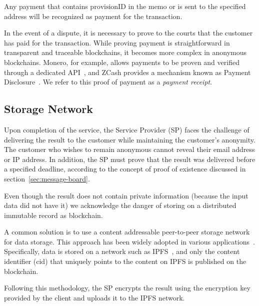 \documentclass[pdftex,twocolumn,epjc3]{svjour3}
\begin{document}
Any payment that contains $\textrm{provisionID}$ in the memo or is sent to the specified address will be recognized as payment for the transaction. 


\begin{sloppypar}
In the event of a dispute, it is necessary to prove to the courts that the customer has paid for the transaction. While proving payment is straightforward in transparent and traceable blockchains, it becomes more complex in anonymous blockchains. Monero, for example, allows payments to be proven and verified through a dedicated API~\cite{moneroHowProvePayment}, and ZCash provides a mechanism known as Payment Disclosure~\cite{daviesIntroductionPaymentDisclosure2017}. We refer to this proof of payment as a \textit{payment receipt}.
\end{sloppypar}

\subsection{Storage Network}\label{storage-network}

Upon completion of the service, the Service Provider (SP) faces the challenge of delivering the result to the customer while maintaining the customer's anonymity. The customer who wishes to remain anonymous cannot reveal their email address or IP address. In addition, the SP must prove that the result was delivered before a specified deadline, according to the concept of proof of existence discussed in section~\ref{sec:message-board}.

Even though the result does not contain private information (because the input data did not have it) we acknowledge the danger of storing on a distributed immutable record as blockchain.

\begin{sloppypar}
A common solution is to use a content addressable peer-to-peer storage network for data storage. This approach has been widely adopted in various applications~\cite{shahidBlockchainBasedAgriFoodSupply2020, wangAuditableProtocolsFair2019, chenImprovedP2PFile2017}. Specifically, data is stored on a network such as IPFS~\cite{benetIPFSContentAddressed2014}, and only the content identifier ($\mathrm{cid}$) that uniquely points to the content on IPFS is published on the blockchain.
\end{sloppypar}

Following this methodology, the SP encrypts the result using the encryption key provided by the client and uploads it to the IPFS network. 
\end{document}
